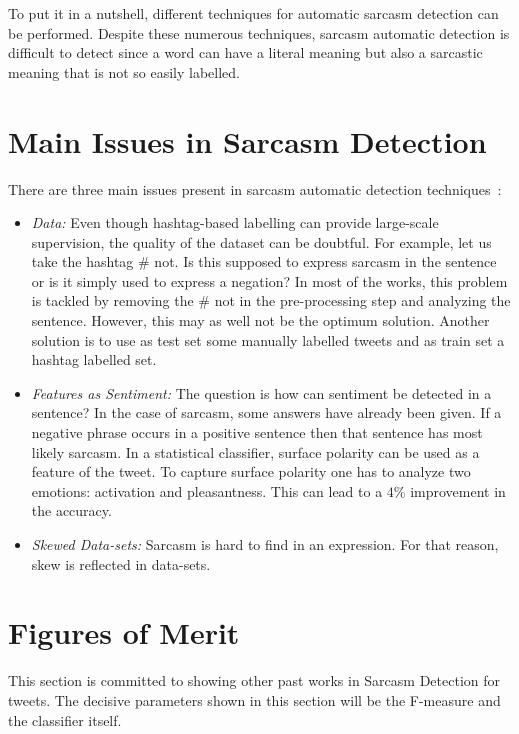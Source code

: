 To put it in a nutshell, different techniques for automatic sarcasm detection can be performed. Despite these numerous techniques, sarcasm automatic detection is difficult to detect since a word can have a literal meaning but also a sarcastic meaning that is not so easily labelled.

\section{Main Issues in Sarcasm Detection}
There are three main issues present in sarcasm automatic detection techniques~\cite{joshi2017automatic}:
\begin{itemize}
	\item \textit{Data:} Even though hashtag-based labelling can provide large-scale supervision, the quality of the dataset can be doubtful. For example, let us take the hashtag \# not. Is this supposed to express sarcasm in the sentence or is it simply used to express a negation? In most of the works, this problem is tackled by removing the \# not in the pre-processing step and analyzing the sentence. However, this may as well not be the optimum solution. Another solution is to use as test set some manually labelled tweets and as train set a hashtag labelled set. 
	\item \textit{Features as Sentiment:} The question is how can sentiment be detected in a sentence? In the case of sarcasm, some answers have already been given. If a negative phrase occurs in a positive sentence then that sentence has most likely sarcasm. In a statistical classifier, surface polarity can be used as a feature of the tweet. To capture surface polarity one has to analyze two emotions: activation and pleasantness. This can lead to a $4\%$ improvement in the accuracy.
	\item \textit{Skewed Data-sets: }
	Sarcasm is hard to find in an expression. For that reason, skew is reflected in data-sets.
\end{itemize}

\section{Figures of Merit}
This section is committed to showing other past works in Sarcasm Detection for tweets. The decisive parameters shown in this section will be the F-measure and the classifier itself.

